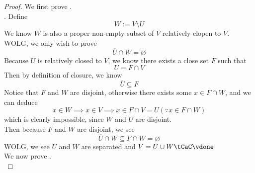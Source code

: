 \documentclass{report}
\begin{document}
\begin{proof}
  We first prove .\\

. Define 
\begin{equation*}
W:=V\setminus U
\end{equation*}
We know $W$ is also a proper non-empty subset of $V$ relatively clopen to $V$. WOLG, we only wish to prove
 \begin{equation*}
\overline{U}\cap W=\varnothing
\end{equation*}
Because $U$ is relatively closed to  $V$, we know there exists a close set  $F$ such that 
 \begin{equation*}
U=F\cap V
\end{equation*}
Then by definition of closure, we know 
\begin{equation*}
\overline{U}\subseteq F
\end{equation*}
Notice that $F$ and $W$ are disjoint, otherwise  there exists some $x\in F\cap W$, and we can deduce
\begin{equation*}
x\in W\implies x\in V\implies x\in F\cap V=U\left(\because x\in F\cap W\right)
\end{equation*}
which is clearly impossible, since $W$ and $U$ are disjoint.\\

Then because $F$ and $W$ are disjoint, we see
\begin{equation*}
\overline{U}\cap W\subseteq F\cap W=\varnothing
\end{equation*}
WOLG, we see $U$ and $W$ are separated and $V=U\cup W\tCaC\vdone$\\

We now prove .\\


\end{proof}
\end{document}
